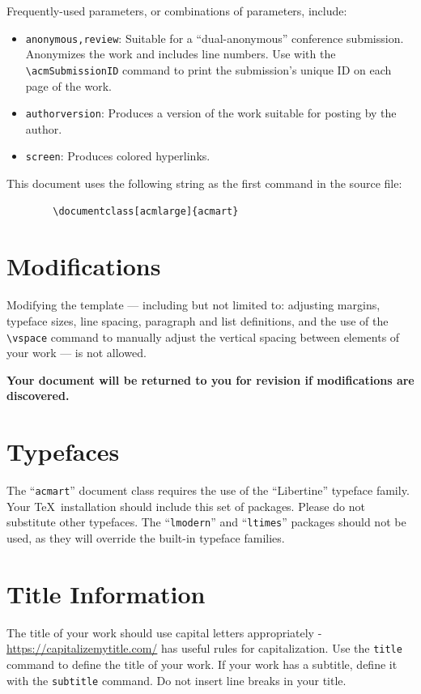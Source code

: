 \documentclass[acmlarge]{acmart}
\begin{document}
	Frequently-used parameters, or combinations of parameters, include:
	\begin{itemize}
		\item {\verb|anonymous,review|}: Suitable for a ``dual-anonymous''
		conference submission. Anonymizes the work and includes line
		numbers. Use with the \verb|\acmSubmissionID| command to print the
		submission's unique ID on each page of the work.
		\item{\verb|authorversion|}: Produces a version of the work suitable
		for posting by the author.
		\item{\verb|screen|}: Produces colored hyperlinks.
	\end{itemize}
	
	This document uses the following string as the first command in the
	source file:
	\begin{verbatim}
		\documentclass[acmlarge]{acmart}
	\end{verbatim}
	
	\section{Modifications}
	
	Modifying the template --- including but not limited to: adjusting
	margins, typeface sizes, line spacing, paragraph and list definitions,
	and the use of the \verb|\vspace| command to manually adjust the
	vertical spacing between elements of your work --- is not allowed.
	
	{\bfseries Your document will be returned to you for revision if
		modifications are discovered.}
	
	\section{Typefaces}
	
	The ``\verb|acmart|'' document class requires the use of the
	``Libertine'' typeface family. Your \TeX\ installation should include
	this set of packages. Please do not substitute other typefaces. The
	``\verb|lmodern|'' and ``\verb|ltimes|'' packages should not be used,
	as they will override the built-in typeface families.
	
	\section{Title Information}
	
	The title of your work should use capital letters appropriately -
	\url{https://capitalizemytitle.com/} has useful rules for
	capitalization. Use the {\verb|title|} command to define the title of
	your work. If your work has a subtitle, define it with the
	{\verb|subtitle|} command.  Do not insert line breaks in your title.
	
\end{document}
